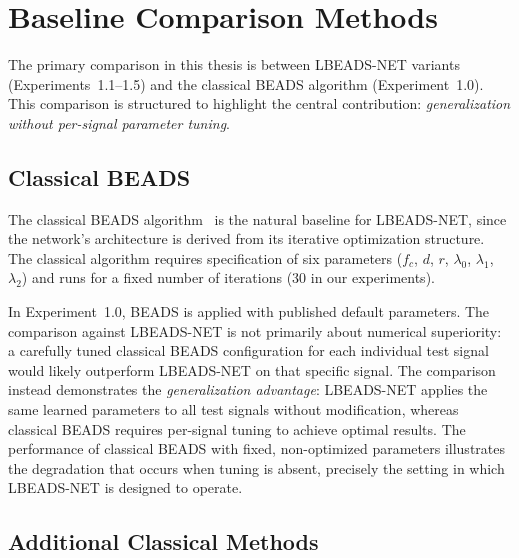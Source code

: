 \section{Baseline Comparison Methods}
\label{sec:exp_baselines}

The primary comparison in this thesis is between LBEADS-NET variants (Experiments~1.1--1.5) and the classical BEADS algorithm (Experiment~1.0). This comparison is structured to highlight the central contribution: \emph{generalization without per-signal parameter tuning}.


\subsection{Classical BEADS}
\label{sec:exp_beads_classical}

The classical BEADS algorithm~\cite{ning2014beads} is the natural baseline for LBEADS-NET, since the network's architecture is derived from its iterative optimization structure. The classical algorithm requires specification of six parameters ($f_c$, $d$, $r$, $\lambda_0$, $\lambda_1$, $\lambda_2$) and runs for a fixed number of iterations (30 in our experiments).

In Experiment~1.0, BEADS is applied with published default parameters. The comparison against LBEADS-NET is not primarily about numerical superiority: a carefully tuned classical BEADS configuration for each individual test signal would likely outperform LBEADS-NET on that specific signal. The comparison instead demonstrates the \emph{generalization advantage}: LBEADS-NET applies the same learned parameters to all test signals without modification, whereas classical BEADS requires per-signal tuning to achieve optimal results. The performance of classical BEADS with fixed, non-optimized parameters illustrates the degradation that occurs when tuning is absent, precisely the setting in which LBEADS-NET is designed to operate.


\subsection{Additional Classical Methods}
\label{sec:exp_additional_baselines}

